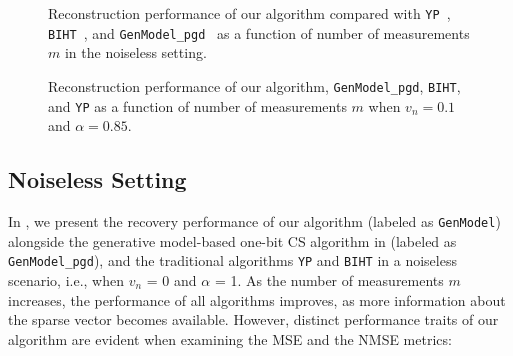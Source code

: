 \documentclass[journal]{IEEEtran}
\begin{document}
 \begin{figure}

\caption{Reconstruction performance of our algorithm compared with \texttt{YP}~\cite{plan2012robust}, \texttt{BIHT}~\cite{binarystableEmbedd}, and  \texttt{GenModel\_pgd}~\cite{liu2020sample} as a function of number of measurements $m$ in the noiseless setting.}
\label{fig:error}
\end{figure}


\begin{figure}[tb!]
\caption{Reconstruction performance of our algorithm, \texttt{GenModel\_pgd}, \texttt{BIHT}, and \texttt{YP} as a function of number of measurements $m$ when $v_n = 0.1$ and $\alpha = 0.85$.}
		\label{fig:noisyerror}
\end{figure}





\subsection{Noiseless Setting}
In , we present the recovery performance of our algorithm (labeled as \texttt{GenModel})  alongside the generative model-based one-bit CS algorithm in  \cite{liu2020sample} (labeled as \texttt{GenModel\_pgd}), and the traditional algorithms \texttt{YP} and \texttt{BIHT} in a noiseless scenario, i.e., when $v_n$ = 0 and $\alpha$ = 1.  As the number of measurements $m$ increases, the performance of all algorithms improves, as more information about the sparse vector becomes available.
 However, distinct performance traits of our algorithm are evident when examining the MSE and the NMSE metrics:
\end{document}
